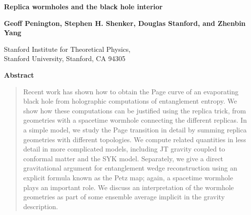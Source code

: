 \documentclass[12pt]{article}
\numberwithin{equation}{section}
\begin{document}
\thispagestyle{empty}


\vspace*{.5cm}
\begin{center}



{\bf {\LARGE Replica wormholes and the black hole interior}}

\begin{center}

\vspace{1cm}


 {\bf Geoff Penington, Stephen H. Shenker, Douglas Stanford, and Zhenbin Yang}\\
  \bigskip \rm
  
\bigskip
Stanford Institute for Theoretical Physics,\\Stanford University, Stanford, CA 94305

\rm
  \end{center}

\vspace{2.5cm}
{\bf Abstract}
\end{center}
\begin{quotation}
\noindent

Recent work has shown how to obtain the Page curve of an evaporating black hole from holographic computations of entanglement entropy. We show how these computations can be justified using the replica trick, from geometries with a spacetime wormhole connecting the different replicas. In a simple model, we study the Page transition in detail by summing replica geometries with different topologies. We  compute related quantities  in less detail in more complicated models, including JT gravity coupled to conformal matter and the SYK model. Separately, we give a direct gravitational argument for entanglement wedge reconstruction using an explicit formula known as the Petz map; again, a spacetime wormhole plays an important role. We discuss an interpretation of the wormhole geometries as part of some ensemble average implicit in the gravity description.

\end{quotation}

\setcounter{page}{0}
\setcounter{tocdepth}{2}
\setcounter{footnote}{0}
\newpage

\tableofcontents

\pagebreak
\end{document}

